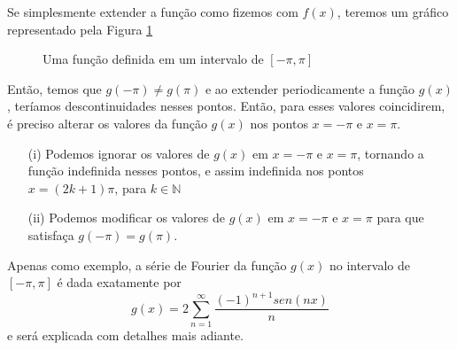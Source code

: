 Se simplesmente extender a função como fizemos com $f(x)$, teremos 
um gráfico representado pela Figura \ref{fig:functImparRep}

\begin{figure}[H]

    \caption{Uma função definida em um intervalo de $[-\pi, \pi]$}
    \label{fig:functImparRep}
\end{figure}

Então, temos que $g(-\pi) \neq g(\pi)$ e ao extender periodicamente
a função $g(x)$, teríamos descontinuidades nesses pontos. Então, para 
esses valores coincidirem, é preciso alterar os valores da função $g(x)$
nos pontos $x = -\pi$ e $x = \pi$.
\\

\begin{enumerate}
    \item[(i)] Podemos ignorar os valores de $g(x)$ em $x = -\pi$ e 
    $x = \pi$, tornando a função indefinida nesses pontos, e assim
    indefinida nos pontos $x = (2k + 1)\pi$, para $k \in \mathbb{N}$
    \item[(ii)] Podemos modificar os valores de $g(x)$ em $x = -\pi$ e
    $x = \pi$ para que satisfaça $g(-\pi) = g(\pi)$.
\end{enumerate}

Apenas como exemplo, a série de Fourier da função $g(x)$ no intervalo
de $[-\pi,\pi]$ é dada exatamente por 
\begin{equation}
    g(x) = 2\sum\limits_{n=1}^{\infty}\dfrac{(-1)^{n+1}sen(nx)}{n}
\end{equation}
e será explicada com detalhes mais adiante.


